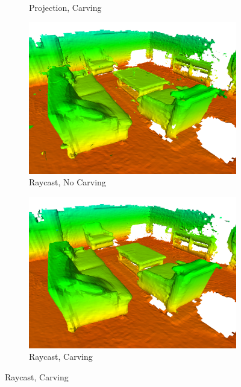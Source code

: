\documentclass[conference]{IEEEtran}
\begin{document}
\begin{figure} [htb]
\begin{minipage}[b]{1.0\linewidth}
\begin{subfigure}[b]{0.47\textwidth}
	 			 \caption{Projection,  Carving}
	 			 \label{fig:proj-carv}
	 		\end{subfigure}
	 		\begin{subfigure}[b]{0.47\textwidth} \centering
	 			\includegraphics[width=1.0\textwidth]{img/fig-apt-trav-nocarv.png}
	 			 \caption{Raycast,  No Carving}
	 			  \label{fig:ray-nocarv}
	 		\end{subfigure}
	 		\begin{subfigure}[b]{0.47\textwidth} \centering
	 			\includegraphics[width=1.0\textwidth]{img/fig-apt-trav-carv.png}
	 			 \caption{Raycast,  Carving}
	 			 \label{fig:ray-carv}
	 		\end{subfigure}
 		\end{minipage}
 	  \begin{subtable}[b]{0.75\linewidth} \centering

\end{subtable}
\end{figure}
\end{document}
